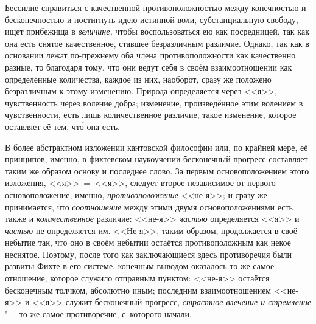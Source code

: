 Бессилие справиться с качественной противоположностью между конечностью и
бесконечностью и постигнуть идею истинной воли, субстанциальную свободу, ищет
прибежища в {\em величине,} чтобы воспользоваться ею как посредницей, так как
она есть снятое качественное, ставшее безразличным различие. Однако, так как
в основании лежат по-прежнему оба члена противоположности как качественно
разные, то благодаря тому, что они ведут себя в своём взаимоотношении как
определённые количества, каждое из них, наоборот, сразу же положено
безразличным к этому изменению. Природа определяется через <<я>>, чувственность
через воление добра; изменение, произведённое этим волением в чувственности,
есть лишь количественное различие, такое изменение, которое оставляет её тем,
чт\'{о} она есть.

В более абстрактном изложении кантовской философии или, по крайней мере, её
принципов, именно, в фихтевском наукоучении бесконечный прогресс составляет таким
же образом основу и последнее слово. За первым основоположением этого
изложения, <<я>>~=~<<я>>, следует второе независимое от первого
основоположение, именно, {\em противоположение} <<не-я>>; и сразу же
принимается, что {\em соотношение} между этими двумя основоположениями есть
также и {\em количественное} различие: <<не-я>> {\em частью} определяется <<я>>
и {\em частью} не определяется им. <<Не-я>>, таким образом, продолжается в своё
небытие так, что оно в своём небытии остаётся противоположным как некое
неснятое. Поэтому, после того как заключающиеся здесь противоречия были развиты
Фихте в его системе, конечным выводом оказалось то же самое отношение, которое
служило отправным пунктом: <<не-я>> остаётся бесконечным
толчком, абсолютно иным; последним
взаимоотношением <<не-я>> и <<я>> служит бесконечный прогресс, {\em страстное
влечение и стремление} "--- то же самое противоречие, с~которого начали.


